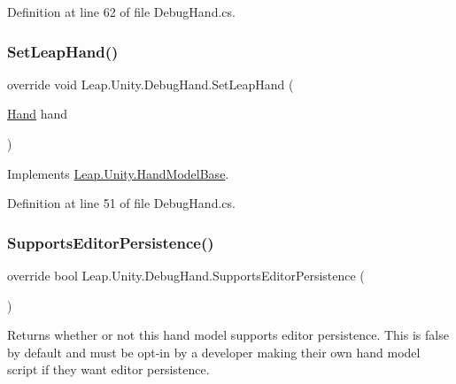 Definition at line 62 of file Debug\+Hand.\+cs.

\mbox{\label{class_leap_1_1_unity_1_1_debug_hand_a22cf0421f70d6ab4129c169116d0d83c}} 
\subsubsection{\texorpdfstring{SetLeapHand()}{SetLeapHand()}}
{\footnotesize\ttfamily override void Leap.\+Unity.\+Debug\+Hand.\+Set\+Leap\+Hand (\begin{DoxyParamCaption}\item[{\mbox{\hyperlink{class_leap_1_1_hand}{Hand}}}]{hand }\end{DoxyParamCaption})\hspace{0.3cm}{\ttfamily [virtual]}}



Implements \mbox{\hyperlink{class_leap_1_1_unity_1_1_hand_model_base_ab8830cac842482ed7d1045beeb54e98c}{Leap.\+Unity.\+Hand\+Model\+Base}}.



Definition at line 51 of file Debug\+Hand.\+cs.

\mbox{\label{class_leap_1_1_unity_1_1_debug_hand_ab2f2c81a42220b3b96cbdabadbfefd17}} 
\subsubsection{\texorpdfstring{SupportsEditorPersistence()}{SupportsEditorPersistence()}}
{\footnotesize\ttfamily override bool Leap.\+Unity.\+Debug\+Hand.\+Supports\+Editor\+Persistence (\begin{DoxyParamCaption}{ }\end{DoxyParamCaption})\hspace{0.3cm}{\ttfamily [virtual]}}



Returns whether or not this hand model supports editor persistence. This is false by default and must be opt-\/in by a developer making their own hand model script if they want editor persistence. 



